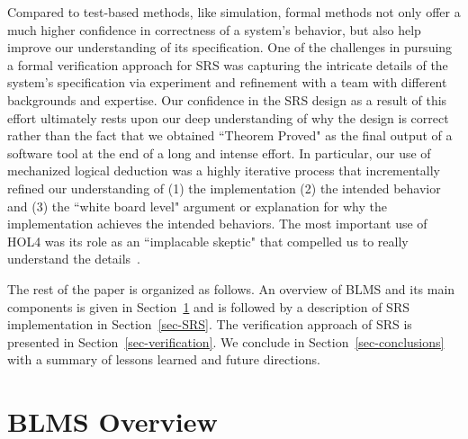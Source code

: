 \documentclass{llncs}
\begin{document}
Compared to test-based methods, like simulation, formal methods not only offer a much higher confidence in correctness of a system's behavior, but also help improve our understanding of its specification.
One of the challenges in pursuing a formal verification approach for SRS was capturing the intricate details of the system's specification via experiment and refinement with a team with different backgrounds and expertise.
Our confidence in the SRS design as a result of this effort ultimately rests upon our deep understanding of why the design is correct rather than the fact that we obtained ``Theorem Proved" as the final output of a software tool at the end of a long and intense effort.
In particular, our use of mechanized logical deduction was a highly iterative process that incrementally refined our understanding of (1) the implementation (2) the intended behavior and (3) the ``white board level" argument or explanation for why the implementation achieves the intended behaviors.
The most important use of HOL4  was its role as an ``implacable skeptic" that compelled us to really understand the details~\cite{rushby}.

The rest of the paper is organized as follows.
An overview of BLMS and its main components is given in Section~\ref{sec-BLM} and is followed by a description of SRS implementation in Section~\ref{sec-SRS}.
The verification approach of SRS is presented in Section~\ref{sec-verification}.
We conclude in Section~\ref{sec-conclusions} with a summary of lessons learned and future directions.



\section{BLMS Overview}
\label{sec-BLM}
\end{document}
